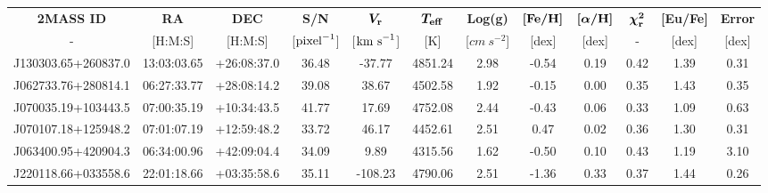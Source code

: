 \documentclass[a4paper,fleqn,usenatbib]{mnras}
\begin{document}
	\begin{table}
		\centering
		\label{Data for the 47}
		\begin{tabular}{@{}cccccccccccc@{}}
			\toprule
			\textbf{2MASS ID}   & \textbf{RA} & \textbf{DEC} & \textbf{S/N}        	& \textbf{$\boldsymbol{V_{\rm{r}}}$}   & \textbf{$\boldsymbol{T_{\rm{eff}}}$} & \textbf{Log(g)}	& \textbf{$\boldsymbol{[\rm{Fe/H}]}$} & \textbf{$\boldsymbol{[\alpha/\rm{H}]}$} & \textbf{$\boldsymbol{\chi_{\rm{r}}^{2}}$} & \textbf{{[}Eu/Fe{]}} & \textbf{Error} \\
			-               	& {[}H:M:S{]}   & {[}H:M:S{]}	& {[}$\rm{pixel}^{-1}${]} & {[}$\rm{km\ s}^{-1}${]} & {[}K{]}             	& {[}$cm\ s^{-2}${]} & {[}dex{]}          	& {[}dex{]}              	& -                        	& {[}dex{]}        	& {[}dex{]}  	\\ \midrule
			J130303.65+260837.0 & 13:03:03.65 & +26:08:37.0  & 36.48               	& -37.77              	& 4851.24             	& 2.98           	& -0.54              	& 0.19                   	& 0.42                     	& 1.39             	& 0.31       	\\
			J062733.76+280814.1 & 06:27:33.77 & +28:08:14.2  & 39.08               	& 38.67               	& 4502.58             	& 1.92           	& -0.15              	& 0.00                   	& 0.35                     	& 1.43             	& 0.35       	\\
			J070035.19+103443.5 & 07:00:35.19 & +10:34:43.5  & 41.77               	& 17.69               	& 4752.08             	& 2.44           	& -0.43              	& 0.06                   	& 0.33                     	& 1.09             	& 0.63       	\\
			J070107.18+125948.2 & 07:01:07.19 & +12:59:48.2  & 33.72               	& 46.17               	& 4452.61             	& 2.51           	& 0.47               	& 0.02                   	& 0.36                     	& 1.30             	& 0.31       	\\
			J063400.95+420904.3 & 06:34:00.96 & +42:09:04.4  & 34.09               	& 9.89                	& 4315.56             	& 1.62           	& -0.50              	& 0.10                   	& 0.43                     	& 1.19             	& 3.10       	\\
			J220118.66+033558.6 & 22:01:18.66 & +03:35:58.6  & 35.11               	& -108.23             	& 4790.06             	& 2.51           	& -1.36              	& 0.33                   	& 0.37                     	& 1.44             	& 0.26       	\\

\end{tabular}
\end{table}
\end{document}
